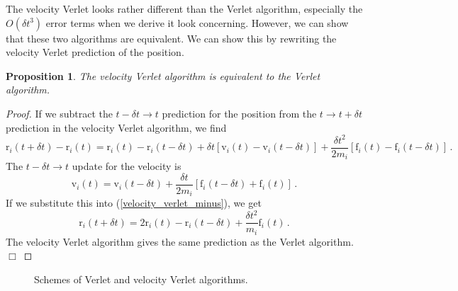 \documentclass{article}
\theoremstyle{plain}\theoremheaderfont{\normalfont\itshape}\theorembodyfont{\rmfamily}\theoremseparator{.}\newtheorem*{rem}{Remark}\newtheorem*{ex}{Example}\newtheorem*{proof}{Proof}\newtheorem*{altp}{Alternative proof}
\theoremstyle{plain}\theoremheaderfont{\normalfont\bfseries}\theorembodyfont{\rmfamily}\theoremseparator{.}\newtheorem{thm}{Theorem}[section]\newtheorem{lem}[thm]{Lemma}\newtheorem{prop}[thm]{Proposition}\newtheorem*{cor}{Corollary}\newtheorem{defn}[thm]{Definition}\newtheorem{clm}[thm]{Claim}\newtheorem{clminproof}{Claim}\newtheorem{alg}[thm]{Algorithm}\newtheorem{hyp}[thm]{Hypothesis}\newtheorem{law}[thm]{Law}
\theoremstyle{break}\theoremheaderfont{\normalfont\itshape}\theorembodyfont{\rmfamily}\theoremseparator{.\medskip}\newtheorem*{proofskip}{Proof}\newtheorem*{exs}{Examples}\newtheorem*{rems}{Remarks}
\theoremstyle{break}\theoremheaderfont{\normalfont\bfseries}\theorembodyfont{\rmfamily}\theoremseparator{.\medskip}\newtheorem{lemskip}[thm]{Lemma}\newtheorem{defnskip}[thm]{Definition}\newtheorem{propskip}[thm]{Proposition}\newtheorem{thmskip}[thm]{Theorem}
\numberwithin{equation}{section}
\newcommand{\qed}{\hfill\ensuremath{\Box}}
\newcommand{\vb}[1]{\bm{\mathrm{#1}}}
\begin{document}
    The velocity Verlet looks rather different than the Verlet algorithm, especially the \(O(\delta t^3)\) error terms when we derive it look concerning. However, we can show that these two algorithms are equivalent. We can show this by rewriting the velocity Verlet prediction of the position.

    \begin{prop}
        The velocity Verlet algorithm is equivalent to the Verlet algorithm.
    \end{prop}
    \begin{proof}
        If we subtract the \(t-\delta t\to t\) prediction for the position from the \(t\to t+\delta t\) prediction in the velocity Verlet algorithm, we find
        \begin{equation}\label{velocity_verlet_minus}
            \vb{r}_i(t+\delta t)-\vb{r}_i(t)=\vb{r}_i(t)-\vb{r}_i(t-\delta t)+\delta t[\vb{v}_i(t)-\vb{v}_i(t-\delta t)]+\frac{\delta t^2}{2m_i}[\vb{f}_i(t)-\vb{f}_i(t-\delta t)]\,.
        \end{equation}
        The \(t-\delta t\to t\) update for the velocity is
        \begin{equation}
            \vb{v}_i(t)=\vb{v}_i(t-\delta t)+\frac{\delta t}{2m_i}[\vb{f}_i(t-\delta t)+\vb{f}_i(t)]\,.
        \end{equation}
        If we substitute this into (\ref{velocity_verlet_minus}), we get
        \begin{equation}
            \vb{r}_i(t+\delta t)=2\vb{r}_i(t)-\vb{r}_i(t-\delta t)+\frac{\delta t^2}{m_i}\vb{f}_i(t)\,.
        \end{equation}
        The velocity Verlet algorithm gives the same prediction as the Verlet algorithm.\qed
    \end{proof}

    \begin{figure}
        \centering
        \caption{Schemes of Verlet and velocity Verlet algorithms.}
    \end{figure}
\end{document}
